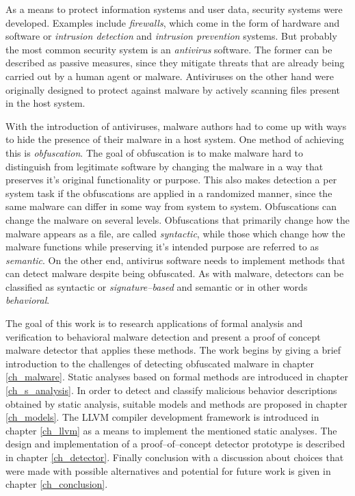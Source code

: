 
As a means to protect information systems and user data, security systems were developed. Examples include \emph{firewalls}, which come in the form of hardware and software or \emph{intrusion detection} and \emph{intrusion prevention} systems. But probably the most common security system is an \emph{antivirus} software. The former can be described as passive measures, since they mitigate threats that are already being carried out by a human agent or malware. Antiviruses on the other hand were originally designed to protect against malware by actively scanning files present in the host system.

With the introduction of antiviruses, malware authors had to come up with ways to hide the presence of their malware in a host system. One method of achieving this is \emph{obfuscation}. The goal of obfuscation is to make malware hard to distinguish from legitimate software by changing the malware in a way that preserves it's original functionality or purpose. This also makes detection a per system task if the obfuscations are applied in a randomized manner, since the same malware can differ in some way from system to system. Obfuscations can change the malware on several levels. Obfuscations that primarily change how the malware appears as a file, are called \emph{syntactic}, while those which change how the malware functions while preserving it's intended purpose are referred to as \emph{semantic}. On the other end, antivirus software needs to implement methods that can detect malware despite being obfuscated. As with malware, detectors can be classified as syntactic or \emph{signature--based} and semantic or in other words \emph{behavioral}.

The goal of this work is to research applications of formal analysis and verification to behavioral malware detection and present a proof of concept malware detector that applies these methods. The work begins by giving a brief introduction to the challenges of detecting obfuscated malware in chapter \ref{ch_malware}. Static analyses based on formal methods are introduced in chapter \ref{ch_s_analysis}. In order to detect and classify malicious behavior descriptions obtained by static analysis, suitable models and methods are proposed in chapter \ref{ch_models}. The LLVM compiler development framework is introduced in chapter \ref{ch_llvm} as a means to implement the mentioned static analyses. The design and implementation of a proof--of--concept detector prototype is described in chapter \ref{ch_detector}. Finally conclusion with a discussion about choices that were made with possible alternatives and potential for future work is given in chapter \ref{ch_conclusion}.

